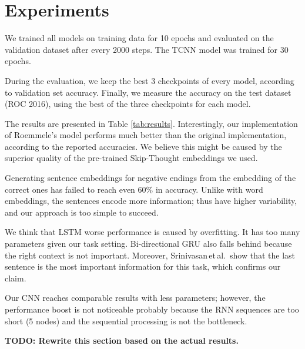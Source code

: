 \documentclass{article}
\begin{document}
\section{Experiments}\label{sec:experiments}
We trained all models on training data for 10 epochs and evaluated on the validation dataset after every 2000 steps. The TCNN model was trained for 30 epochs.

During the evaluation, we keep the best 3 checkpoints of every model, according to validation set accuracy. Finally, we measure the accuracy on the test dataset (ROC 2016), using the best of the three checkpoints for each model. 

The results are presented in Table \ref{tab:results}. Interestingly, our implementation of Roemmele's model performs much better than the original implementation, according to the reported accuracies. We believe this might be caused by the superior quality of the pre-trained Skip-Thought embeddings we used.

Generating sentence embeddings for negative endings from the embedding of the correct ones has failed to reach even 60\% in accuracy. Unlike with word embeddings, the sentences encode more information; thus have higher variability, and our approach is too simple to succeed.

We think that LSTM worse performance is caused by overfitting. It has too many parameters given our task setting. Bi-directional GRU also falls behind because the right context is not important. Moreover, Srinivasan\,et\,al.\,\citep{Srinivasan2018ATest} show that the last sentence is the most important information for this task, which confirms our claim. 

Our CNN reaches comparable results with less parameters; however, the performance boost is not noticeable probably because the RNN sequences are too short (5 nodes) and the sequential processing is not the bottleneck. 

\textbf{TODO: Rewrite this section based on the actual results.}
\end{document}
